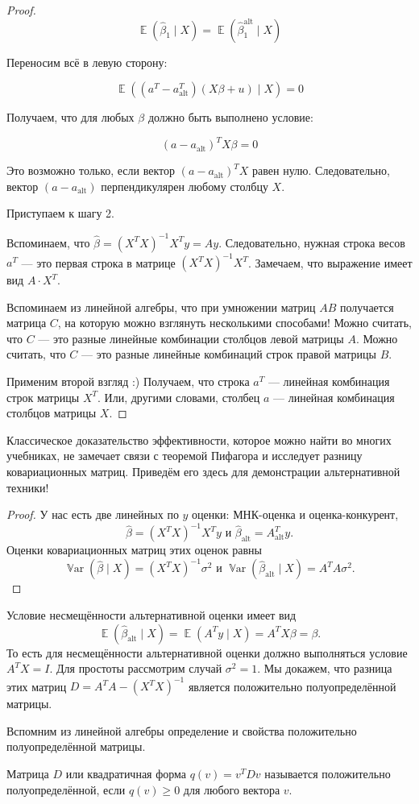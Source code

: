 \documentclass[12pt]{article}
\DeclareMathOperator{\Var}{\mathbb{V}ar}
\DeclareMathOperator{\E}{\mathbb{E}}
\newcommand{\hb}{\hat{\beta}}
\newcommand{\alt}{\text{alt}}
\begin{document}
\begin{proof}
\[
\E(\hb_1 \mid X) = \E(\hb_1^{\alt} \mid X)
\]

Переносим всё в левую сторону:

\[
\E((a^T - a^T_{\alt})(X\beta + u) \mid X) = 0
\]

Получаем, что для любых $\beta$ должно быть выполнено условие:

\[
(a - a_{\alt})^T X\beta = 0
\]

Это возможно только, если вектор $(a - a_{\alt})^T X$ равен нулю. 
Следовательно, вектор $(a - a_{\alt})$ перпендикулярен любому столбцу $X$.


Приступаем к шагу 2.

Вспоминаем, что $\hat \beta = (X^T X)^{-1}X^T y = Ay$. Следовательно, нужная строка весов $a^T$ — 
это первая строка в матрице $(X^TX)^{-1}X^T$. 
Замечаем, что выражение имеет вид $A \cdot X^T$. 

Вспоминаем из линейной алгебры, что при умножении матриц $AB$ получается матрица $C$, 
на которую можно взглянуть несколькими способами!
Можно считать, что $C$ — это разные линейные комбинации столбцов левой матрицы $A$. 
Можно считать, что $C$ — это разные линейные комбинаций строк правой матрицы $B$.

Применим второй взгляд :) Получаем, что строка $a^T$ — линейная комбинация строк матрицы $X^T$. 
Или, другими словами, столбец $a$ — линейная комбинация столбцов матрицы $X$.
\end{proof}

Классическое доказательство эффективности, которое можно найти во многих учебниках, не замечает связи с теоремой Пифагора и исследует разницу ковариационных матриц. 
Приведём его здесь для демонстрации альтернативной техники!
\begin{proof}
У нас есть две линейных по $y$ оценки: МНК-оценка и оценка-конкурент,
\[
\hb = (X^TX)^{-1}X^T y \text{ и } \hb_{\alt} = A^T_{\alt} y.
\]
Оценки ковариационных матриц этих оценок равны 
\[
\Var(\hb \mid X) = (X^TX)^{-1} \sigma^2 \text{ и } \Var(\hb_{\alt} \mid X) = A^TA \sigma^2.
\]
\end{proof}
Условие несмещённости альтернативной оценки имеет вид 
\[
\E(\hb_{\alt} \mid X) = \E(A^T y \mid X) = A^T X\beta = \beta.
\]
То есть для несмещённости альтернативной оценки должно выполняться условие $A^T X = I$.
Для простоты рассмотрим случай $\sigma^2 = 1$.
Мы докажем, что разница этих матриц $D = A^TA - (X^TX)^{-1}$ является положительно полуопределённой матрицы. 

Вспомним из линейной алгебры определение и свойства положительно полуопределённой матрицы.
\begin{definition}
Матрица $D$ или квадратичная форма $q(v) = v^T D v$ называется положительно полуопределённой, если $q(v) \geq 0$ для любого вектора $v$.
\end{definition}
\end{document}
